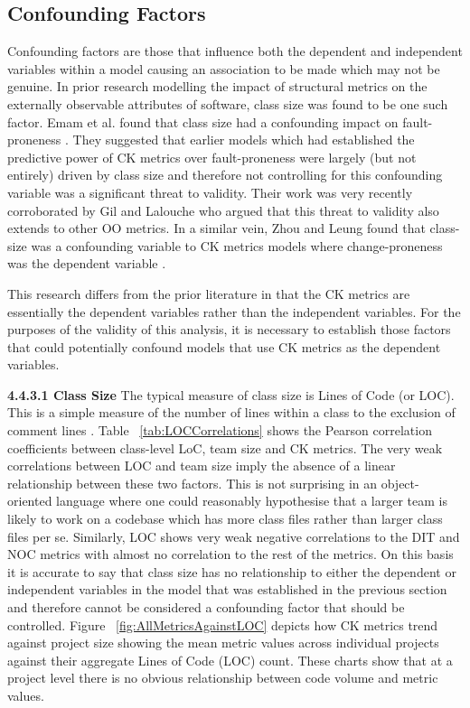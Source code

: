 \subsection{Confounding Factors}
Confounding factors are those that influence both the dependent and independent variables within a model causing an association to be made which may not be genuine. In prior research modelling the impact of structural metrics on the externally observable attributes of software, class size was found to be one such factor. Emam et al. found that class size had a confounding impact on fault-proneness \citep{el2001prediction}. They suggested that earlier models which had established the predictive power of CK metrics over fault-proneness were largely (but not entirely) driven by class size and therefore not controlling for this confounding variable was a significant threat to validity. Their work was very recently corroborated by Gil and Lalouche \citep{gil2017correlation} who argued that this threat to validity also extends to other OO metrics. In a similar vein, Zhou and Leung found that class-size was a confounding variable to CK metrics models where change-proneness was the dependent variable \citep{zhou2006empirical}.

This research differs from the prior literature in that the CK metrics are essentially the dependent variables rather than the independent variables. For the purposes of the validity of this analysis, it is necessary to establish those factors that could potentially confound models that use CK metrics as the dependent variables.

\newline
\textbf{4.4.3.1 Class Size}
\newline
The typical measure of class size is  Lines of Code (or LOC). This is a simple measure of the number of lines within a class to the exclusion of comment lines \citep{nguyen2007sloc}. Table ~\ref{tab:LOCCorrelations} shows the Pearson correlation coefficients between class-level LoC, team size and CK metrics.  The very weak correlations between LOC and team size imply the absence of a linear relationship between these two factors. This is not surprising in an object-oriented language where one could reasonably hypothesise that a larger team is likely to work on a codebase which has more class files rather than larger class files per se. Similarly, LOC shows very weak negative correlations to the DIT and NOC metrics with almost no correlation to the rest of the metrics. On this basis it is accurate to say that class size has no relationship to either the dependent or independent variables in the model that was established in the previous section and therefore cannot be considered a confounding factor that should be controlled. Figure ~\ref{fig:AllMetricsAgainstLOC}  depicts how CK metrics trend against project size showing the mean metric values across individual projects against their aggregate Lines of Code (LOC) count. These charts show that at a project level there is no obvious relationship between code volume and metric values.

